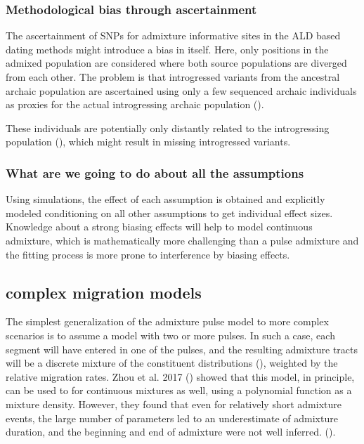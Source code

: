 \documentclass[]{article}
\begin{document}
\subsubsection{Methodological bias through
ascertainment}\label{methodological-bias-through-ascertainment}

The ascertainment of SNPs for admixture informative sites in the ALD
based dating methods might introduce a bias in itself. Here, only
positions in the admixed population are considered where both source
populations are diverged from each other. The problem is that
introgressed variants from the ancestral archaic population are
ascertained using only a few sequenced archaic individuals as proxies
for the actual introgressing archaic population
(\cite{sankararaman_date_2012,fu_genome_2014,sankararaman_combined_2016,moorjani_genetic_2016}).

These individuals are potentially only distantly related to the
introgressing population (\cite{jacobs_multiple_2019}), which might
result in missing introgressed variants.

\subsubsection{What are we going to do about all the
assumptions}\label{what-are-we-going-to-do-about-all-the-assumptions}

Using simulations, the effect of each assumption is obtained and
explicitly modeled conditioning on all other assumptions to get
individual effect sizes. Knowledge about a strong biasing effects will
help to model continuous admixture, which is mathematically more
challenging than a pulse admixture and the fitting process is more prone
to interference by biasing effects.


\subsection{complex migration models}

The simplest generalization of the admixture pulse model to more complex scenarios is to assume a model with two or more pulses. In such a case,  each segment will have entered in one of the pulses, and the resulting admixture tracts will be a discrete mixture of the constituent distributions (\cite{pickrell_ancient_2014}), weighted by the relative migration rates. Zhou et al. 2017 (\cite{zhou_modeling_2017}) showed that this model, in principle, can be used to for continuous mixtures as well, using a polynomial function as a mixture density. However, they found that even for relatively short admixture events, the large number of parameters led to an underestimate of admixture duration, and the beginning and end of admixture were not well inferred.
(\cite{zhou_modeling_2017}). 
\end{document}
